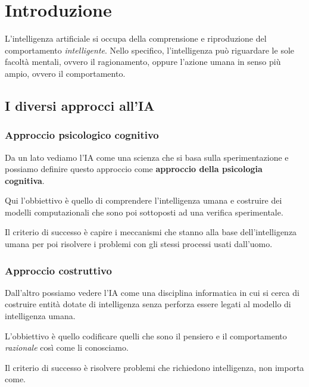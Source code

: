 \chapter{Introduzione}
L'intelligenza artificiale si occupa della comprensione e riproduzione del
comportamento \emph{intelligente}. Nello specifico, l'intelligenza pu\`o riguardare
le sole facolt\`a mentali, ovvero il ragionamento, oppure l'azione umana in senso
pi\`u ampio, ovvero il comportamento.

\section{I diversi approcci all'IA}
\subsection{Approccio psicologico cognitivo}
Da un lato vediamo l'IA come una scienza che si basa sulla sperimentazione e possiamo
definire questo approccio come \textbf{approccio della psicologia cognitiva}.

Qui  l'obbiettivo \`e quello di comprendere l'intelligenza umana e costruire dei
modelli computazionali che sono poi sottoposti ad una verifica sperimentale.

Il criterio di successo \`e capire i meccanismi che stanno alla base
dell'intelligenza umana per poi risolvere i problemi con gli stessi processi usati
dall'uomo.

\subsection{Approccio costruttivo}
Dall'altro possiamo vedere l'IA come una disciplina informatica in cui si cerca di
costruire entit\`a dotate di intelligenza senza perforza essere legati al modello di
intelligenza umana.

L'obbiettivo \`e quello codificare quelli che sono il pensiero e il comportamento
\emph{razionale} cos\`i come li conosciamo.

Il criterio di successo \`e risolvere problemi che richiedono intelligenza, non
importa come.

